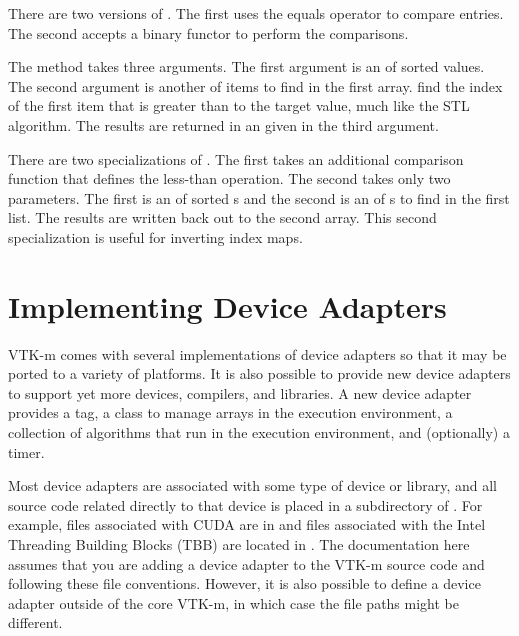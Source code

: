 \begin{description}
  There are two versions of . The first uses the equals
  operator to compare entries. The second accepts a binary functor to
  perform the comparisons.
\item[\textcode{UpperBounds}]  The
   method takes three arguments. The first argument
  is an  of sorted values. The second argument
  is another  of items to find in the first
  array.  find the index of the first item that is
  greater than to the target value, much like the
   STL algorithm. The results are returned in
  an  given in the third argument.

  There are two specializations of . The first takes
  an additional comparison function that defines the less-than
  operation. The second takes only two parameters. The first is an
   of sorted s and the second is an
   of s to find in the first list. The
  results are written back out to the second array. This second
  specialization is useful for inverting index maps.
\end{description}



\section{Implementing Device Adapters}
\label{sec:ImplementingDeviceAdapters}

VTK-m comes with several implementations of device adapters so that it may
be ported to a variety of platforms. It is also possible to provide new
device adapters to support yet more devices, compilers, and libraries. A
new device adapter provides a tag, a class to manage arrays in the
execution environment, a collection of algorithms that run in the execution
environment, and (optionally) a timer.

Most device adapters are associated with some type of device or library,
and all source code related directly to that device is placed in a
subdirectory of . For example, files associated
with CUDA are in  and files associated with
the Intel Threading Building Blocks (TBB) are located in
. The documentation here assumes that you are
adding a device adapter to the VTK-m source code and following these file
conventions. However, it is also possible to define a device adapter
outside of the core VTK-m, in which case the file paths might be different.

